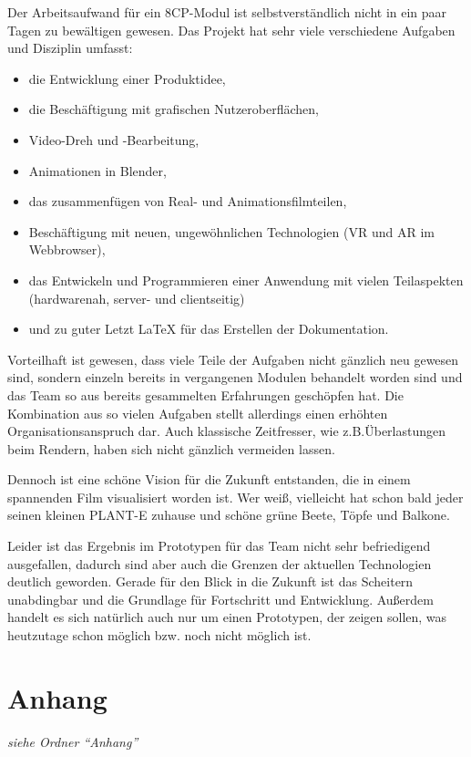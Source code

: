 Der Arbeitsaufwand für ein 8CP-Modul ist selbstverständlich nicht in ein
paar Tagen zu bewältigen gewesen. Das Projekt hat sehr viele
verschiedene Aufgaben und Disziplin umfasst:

\begin{itemize}
\tightlist
\item
  die Entwicklung einer Produktidee,
\item
  die Beschäftigung mit grafischen Nutzeroberflächen,
\item
  Video-Dreh und -Bearbeitung,
\item
  Animationen in Blender,
\item
  das zusammenfügen von Real- und Animationsfilmteilen,
\item
  Beschäftigung mit neuen, ungewöhnlichen Technologien (VR und AR im
  Webbrowser),
\item
  das Entwickeln und Programmieren einer Anwendung mit vielen
  Teilaspekten (hardwarenah, server- und clientseitig)
\item
  und zu guter Letzt LaTeX für das Erstellen der Dokumentation.
\end{itemize}

Vorteilhaft ist gewesen, dass viele Teile der Aufgaben nicht gänzlich
neu gewesen sind, sondern einzeln bereits in vergangenen Modulen
behandelt worden sind und das Team so aus bereits gesammelten
Erfahrungen geschöpfen hat. Die Kombination aus so vielen Aufgaben
stellt allerdings einen erhöhten Organisationsanspruch dar. Auch
klassische Zeitfresser, wie z.B.Überlastungen beim Rendern, haben sich
nicht gänzlich vermeiden lassen.

Dennoch ist eine schöne Vision für die Zukunft entstanden, die in einem
spannenden Film visualisiert worden ist. Wer weiß, vielleicht hat schon
bald jeder seinen kleinen PLANT-E zuhause und schöne grüne Beete, Töpfe
und Balkone.

Leider ist das Ergebnis im Prototypen für das Team nicht sehr
befriedigend ausgefallen, dadurch sind aber auch die Grenzen der
aktuellen Technologien deutlich geworden. Gerade für den Blick in die
Zukunft ist das Scheitern unabdingbar und die Grundlage für Fortschritt
und Entwicklung. Außerdem handelt es sich natürlich auch nur um einen
Prototypen, der zeigen sollen, was heutzutage schon möglich bzw. noch
nicht möglich ist.

\hypertarget{anhang}{%
\section{Anhang}\label{anhang}}

\emph{siehe Ordner ``Anhang''}
